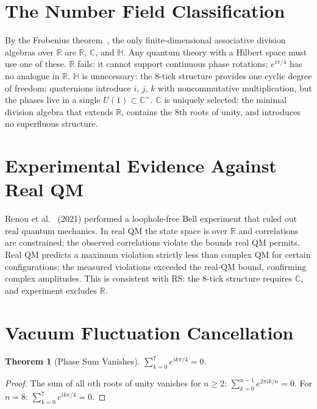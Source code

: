 \documentclass[12pt,a4paper]{article}
\newtheorem{theorem}{Theorem}[section]
\theoremstyle{definition}
\theoremstyle{remark}
\begin{document}
\section{The Number Field Classification}

By the Frobenius theorem~\cite{Frobenius}, the only finite-dimensional associative
division algebras over $\mathbb{R}$ are $\mathbb{R}$, $\mathbb{C}$,
and $\mathbb{H}$.  Any quantum theory with a Hilbert space must use
one of these.  $\mathbb{R}$ fails: it cannot support continuous
phase rotations; $e^{i\pi/4}$ has no analogue in $\mathbb{R}$.
$\mathbb{H}$ is unnecessary: the 8-tick structure provides one
cyclic degree of freedom; quaternions introduce $i$, $j$, $k$ with
noncommutative multiplication, but the phases live in a single
$U(1) \subset \mathbb{C}^\times$.  $\mathbb{C}$ is uniquely
selected: the minimal division algebra that extends $\mathbb{R}$,
contains the 8th roots of unity, and introduces no superfluous
structure.

\section{Experimental Evidence Against Real QM}

Renou et al.~\cite{Renou} (2021) performed a loophole-free Bell
experiment that ruled out real quantum mechanics.  In real QM the
state space is over $\mathbb{R}$ and correlations are constrained;
the observed correlations violate the bounds real QM permits.  Real
QM predicts a maximum violation strictly less than complex QM for
certain configurations; the measured violations exceeded the
real-QM bound, confirming complex amplitudes.  This is consistent
with RS: the 8-tick structure requires $\mathbb{C}$, and experiment
excludes $\mathbb{R}$.

\section{Vacuum Fluctuation Cancellation}

\begin{theorem}[Phase Sum Vanishes]
$\sum_{k=0}^7 e^{ik\pi/4} = 0$.
\end{theorem}

\begin{proof}
The sum of all $n$th roots of unity vanishes for $n \geq 2$:
$\sum_{k=0}^{n-1} e^{2\pi ik/n} = 0$.  For $n = 8$:
$\sum_{k=0}^7 e^{ik\pi/4} = 0$.
\end{proof}
\end{document}
